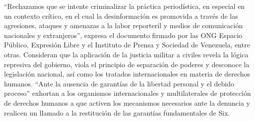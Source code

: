 \documentclass{article}%
\begin{document}
\newline%
%
“Rechazamos que se intente criminalizar la práctica periodística, en especial en un contexto crítico, en el cual la desinformación es promovida a través de las agresiones, ataques y amenazas a la labor reporteril y medios de comunicación nacionales y extranjeros”, expresa el documento firmado por las ONG Espacio Público, Expresión Libre y el Instituto de Prensa y Sociedad de Venezuela, entre otras.%
\newline%
%
Consideran que la aplicación de la justicia militar a civiles revela la lógica represiva del gobierno, viola el principio de separación de poderes y desconoce la legislación nacional, así como los tratados internacionales en materia de derechos humanos.%
\newline%
%
“Ante la ausencia de garantías de la libertad personal y el debido proceso” exhortan a los organismos internacionales y multilaterales de protección de derechos humanos a que activen los mecanismos necesarios ante la denuncia y realicen un llamado a la restitución de las garantías fundamentales de Six.%
\newline%
%
\end{document}
